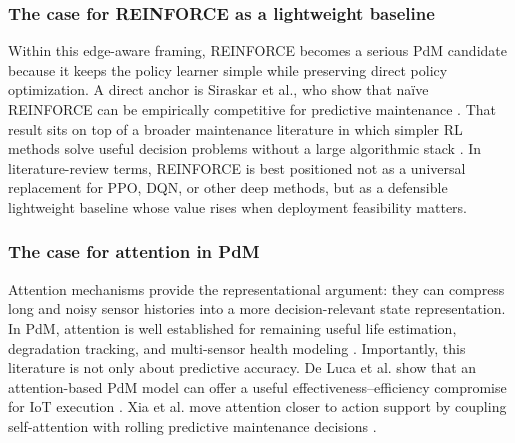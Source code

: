 \documentclass[refree,sn-basic]{sn-jnl} %
\begin{document}
\subsubsection{The case for REINFORCE as a lightweight baseline}
Within this edge-aware framing, REINFORCE becomes a serious PdM candidate because it keeps the policy learner simple while preserving direct policy optimization. A direct anchor is Siraskar et al., who show that na\"{i}ve REINFORCE can be empirically competitive for predictive maintenance \cite{Siraskar2025}. That result sits on top of a broader maintenance literature in which simpler RL methods solve useful decision problems without a large algorithmic stack \cite{Wang2014, Adsule2020, Yousefi2020}. In literature-review terms, REINFORCE is best positioned not as a universal replacement for PPO, DQN, or other deep methods, but as a defensible lightweight baseline whose value rises when deployment feasibility matters.

\subsubsection{The case for attention in PdM}
Attention mechanisms provide the representational argument: they can compress long and noisy sensor histories into a more decision-relevant state representation. In PdM, attention is well established for remaining useful life estimation, degradation tracking, and multi-sensor health modeling \cite{Chen2020, Chen2021, Chadha2022, DeLuca2023}. Importantly, this literature is not only about predictive accuracy. De Luca et al. show that an attention-based PdM model can offer a useful effectiveness--efficiency compromise for IoT execution \cite{DeLuca2023}. Xia et al. move attention closer to action support by coupling self-attention with rolling predictive maintenance decisions \cite{Xia2022}.
\end{document}
